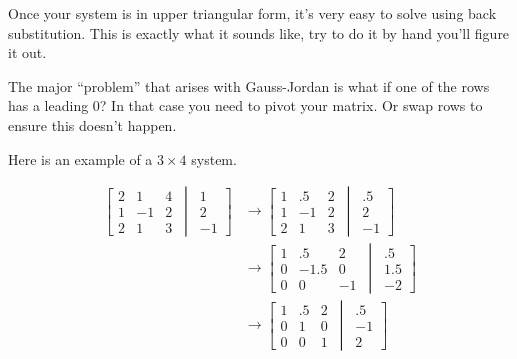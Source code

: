 \documentclass[11pt,letterpaper]{article}
\begin{document}
Once your system is in upper triangular form, it's very easy to solve using back substitution. This
is exactly what it sounds like, try to do it by hand you'll figure it out.

The major ``problem'' that arises with Gauss-Jordan is what if one of the rows has a leading 0?
In that case you need to pivot your matrix. Or swap rows to ensure this doesn't happen.


Here is an example of a $3\times 4$ system.

\begin{align*}
\left[ \begin{matrix} 2 & 1 & 4 \\ 1 & -1 & 2 \\ 2 & 1 & 3 \end{matrix}\, \middle|\, \begin{matrix} 1 \\ 2 \\ -1 \end{matrix} \right] & \rightarrow 
\left[ \begin{matrix} 1 & .5 & 2 \\ 1 & -1 & 2 \\ 2 & 1 & 3 \end{matrix}\, \middle|\, \begin{matrix} .5 \\ 2 \\ -1 \end{matrix} \right] \\
& \rightarrow 
\left[ \begin{matrix} 1 & .5 & 2 \\ 0 & -1.5 & 0 \\ 0 & 0 & -1 \end{matrix}\, \middle|\, \begin{matrix} .5 \\ 1.5 \\ -2 \end{matrix} \right] \\
& \rightarrow 
\left[ \begin{matrix} 1 & .5 & 2 \\ 0 & 1 & 0 \\ 0 & 0 & 1 \end{matrix}\, \middle|\, \begin{matrix} .5 \\ -1 \\ 2 \end{matrix} \right]
\end{align*}
\end{document}

